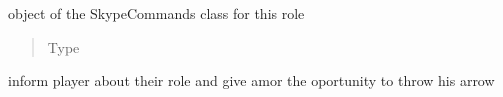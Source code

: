 \documentclass[letterpaper,10pt,english]{sphinxmanual}
\begin{document}
\begin{fulllineitems}
\begin{fulllineitems}
\begin{quote}
\begin{description}
\end{description}\end{quote}

\end{fulllineitems}



\begin{fulllineitems}
object of the SkypeCommands class for this role
\begin{quote}\begin{description}
\item[{Type}] \leavevmode
{\hyperref[\detokenize{chatwolf:chatwolf.skypecommands.SkypeCommands}]{}}

\end{description}\end{quote}

\end{fulllineitems}



\begin{fulllineitems}
inform player about their role and give amor the oportunity to throw his arrow

\end{fulllineitems}



\begin{fulllineitems}
\end{fulllineitems}


\end{fulllineitems}
\end{document}
